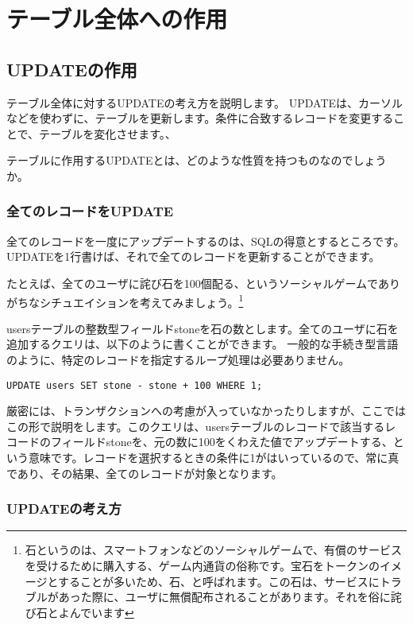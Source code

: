 \chapter{テーブル全体への作用}


\section{UPDATEの作用}

テーブル全体に対するUPDATEの考え方を説明します。
UPDATEは、カーソルなどを使わずに、テーブルを更新します。条件に合致するレコードを変更することで、テーブルを変化させます。、

テーブルに作用するUPDATEとは、どのような性質を持つものなのでしょうか。

\subsection{全てのレコードをUPDATE}
全てのレコードを一度にアップデートするのは、SQLの得意とするところです。UPDATEを1行書けば、それで全てのレコードを更新することができます。

たとえば、全てのユーザに詫び石を100個配る、というソーシャルゲームでありがちなシチュエイションを考えてみましょう。\footnote{石というのは、スマートフォンなどのソーシャルゲームで、有償のサービスを受けるために購入する、ゲーム内通貨の俗称です。宝石をトークンのイメージとすることが多いため、石、と呼ばれます。この石は、サービスにトラブルがあった際に、ユーザに無償配布されることがあります。それを俗に詫び石とよんでいます}

usersテーブルの整数型フィールドstoneを石の数とします。全てのユーザに石を追加するクエリは、以下のように書くことができます。
一般的な手続き型言語のように、特定のレコードを指定するループ処理は必要ありません。

\begin{verbatim}
UPDATE users SET stone - stone + 100 WHERE 1;
\end{verbatim}

厳密には、トランザクションへの考慮が入っていなかったりしますが、ここではこの形で説明をします。このクエリは、usersテーブルのレコードで該当するレコードのフィールドstoneを、元の数に100をくわえた値でアップデートする、という意味です。レコードを選択するときの条件に1がはいっているので、常に真であり、その結果、全てのレコードが対象となります。


\subsection{UPDATEの考え方}


